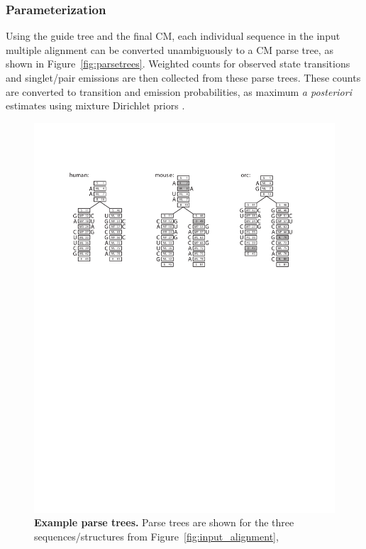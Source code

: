 \subsubsection{Parameterization}

Using the guide tree and the final CM, each individual sequence in the
input multiple alignment can be converted unambiguously to a CM parse
tree, as shown in Figure~\ref{fig:parsetrees}. Weighted counts for
observed state transitions and singlet/pair emissions are then
collected from these parse trees. These counts are converted to
transition and emission probabilities, as maximum \emph{a posteriori}
estimates using mixture Dirichlet priors
\citep{Sjolander96,Durbin98,NawrockiEddy07}. 

\begin{figure}[t]
\begin{center}
\includegraphics[width=5in]{Figures/parsetrees}
\end{center}
\caption{\small\textbf{Example parse trees.} Parse trees are shown for the
three sequences/structures from Figure~\ref{fig:input_alignment},
}
\end{figure}

